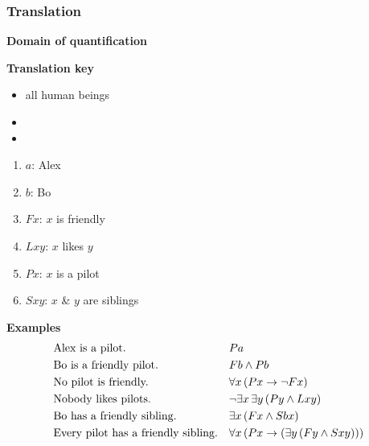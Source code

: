 \documentclass[fleqn,10pt,serif,xcolor=svgnames,xcolor=table,aspectratio=169,handout]{beamer}
\begin{document}
\begin{frame}
  \frametitle{Translation}

  \begin{minipage}{0.3\linewidth}
    \textbf{Domain of quantification}
  \end{minipage}
  \hfill
  \begin{minipage}{0.65\linewidth}
      \textbf{Translation key}
\end{minipage}

\begin{minipage}{0.3\linewidth}
  \begin{itemize}
    \item[] all human beings
    \item[]
    \item[]
  \end{itemize}
  \end{minipage}
  \hfill
  \begin{minipage}{0.65\linewidth}
    \begin{multicols}{2}
    \begin{enumerate}
      \item[] $a$: Alex
      \item[] $b$: Bo
      \item[] $Fx$: $x$ is friendly
      \item[] $Lxy$: $x$ likes $y$
      \item[] $Px$: $x$ is a pilot
      \item[] $Sxy$: $x$ \& $y$ are siblings
    \end{enumerate}
  \end{multicols}
\end{minipage}

\bigskip
\bigskip

\textbf{Examples}
  \begin{align*}
    & \text{Alex is a pilot.}
    && Pa
    \\
    & \text{Bo is a friendly pilot.}
    && Fb \wedge Pb
    \\
    & \text{No pilot is friendly.}
    && \forall x \thinspace (Px \rightarrow \neg Fx)
    \\
    & \text{Nobody likes pilots.}
    && \neg \exists x \thinspace \exists y \thinspace (Py \wedge Lxy)
    \\
    & \text{Bo has a friendly sibling.}
    && \exists x \thinspace (Fx \wedge Sbx)
    \\
    & \text{Every pilot has a friendly sibling.}
    && \forall x \thinspace (Px \rightarrow (\exists y \thinspace (Fy \wedge Sxy)))
  \end{align*}
\end{frame}
\end{document}
